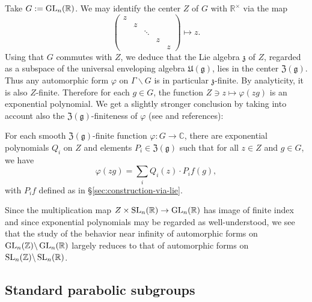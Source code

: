 \documentclass[reqno]{amsart} 
\begin{document}
Take $G := \operatorname{GL}_n(\mathbb{R})$.  We may identify the center $Z$ of $G$ with $\mathbb{R}^\times$ via the map
\begin{equation*}
  \begin{pmatrix}
    z &  &  &  &  \\
      & z &  &  &  \\
      &  & \ddots &  &  \\
      &  &  & z &  \\
      &  &  &  & z
  \end{pmatrix}
  \mapsto z.
\end{equation*}
Using that $G$ commutes with $Z$, we deduce that the Lie algebra $\mathfrak{z}$ of $Z$, regarded as a subspace of the universal enveloping algebra $\mathfrak{U}(\mathfrak{g})$, lies in the center $\mathfrak{Z}(\mathfrak{g})$.  Thus any automorphic form $\varphi$ on $\Gamma \backslash G$ is in particular $\mathfrak{z}$-finite.  By analyticity, it is also $Z$-finite.  Therefore for each $g \in G$, the function $Z \ni z \mapsto \varphi(z g)$ is an exponential polynomial.  We get a slightly stronger conclusion by taking into account also the $\mathfrak{Z}(\mathfrak{g})$-finiteness of $\varphi$ (see \cite[\S5.6]{MR2331343} and references):
\begin{lemma}
  For each smooth $\mathfrak{Z}(\mathfrak{g})$-finite function $\varphi : G \rightarrow \mathbb{C}$,
  there are exponential polynomials $Q_i $ on $Z$
  and elements $P_i \in \mathfrak{Z}(\mathfrak{g})$ such that for all $z \in Z$ and $g \in G$, we have
  \begin{equation}
    \varphi (z g) = \sum _{i} Q_i(z) \cdot P_i f(g),
  \end{equation}
  with $P_i f$ defined as in \S\ref{sec:construction-via-lie}.
\end{lemma}

Since the multiplication map $Z \times \operatorname{SL}_n(\mathbb{R}) \rightarrow \operatorname{GL}_n(\mathbb{R})$ has image of finite index and since exponential polynomials may be regarded as well-understood, we see that the study of the behavior near infinity of automorphic forms on $\operatorname{GL}_n(\mathbb{Z}) \backslash \operatorname{GL}_n(\mathbb{R})$ largely reduces to that of automorphic forms on $\operatorname{SL}_n(\mathbb{Z}) \backslash \operatorname{SL}_n(\mathbb{R})$.

\subsection{Standard parabolic subgroups}\label{sec:stand-parab-subgr}
\end{document}
